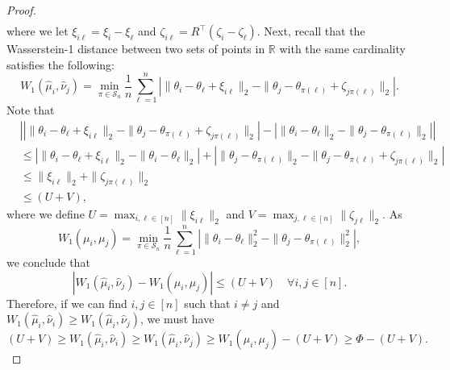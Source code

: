\documentclass[11pt,letterpaper]{article}
\theoremstyle{definition}
\numberwithin{equation}{section}
\newcommand{\cS}{\mathcal{S}}
\newcommand{\R}{\mathbb{R}}
\begin{document}
\begin{proof}
\begin{align*}
    \end{align*}
    where we let $\xi_{i \ell} = \xi_i - \xi_\ell$ and $\zeta_{i \ell} = R^\top (\zeta_i - \zeta_\ell)$. Next, recall that the Wasserstein-1 distance between two sets of points in $\R$ with the same cardinality satisfies the following:
    \begin{equation*}
        W_1(\hat{\mu}_i, \hat{\nu}_j) = \min_{\pi \in \cS_n} \frac{1}{n} \sum_{\ell = 1}^{n} \left|\|\theta_i - \theta_\ell + \xi_{i \ell}\|_2 - \|\theta_j - \theta_{\pi(\ell)} + \zeta_{j \pi(\ell)}\|_2\right|.
    \end{equation*}
    Note that   
    \begin{equation*}
        \begin{split}
            & \left|\left|\|\theta_i - \theta_\ell + \xi_{i \ell}\|_2 - \|\theta_j - \theta_{\pi(\ell)} + \zeta_{j \pi(\ell)}\|_2\right| - \left|\|\theta_i - \theta_\ell\|_2 - \|\theta_j - \theta_{\pi(\ell)}\|_2\right|\right| \\
            & \le \left|\|\theta_i - \theta_\ell + \xi_{i \ell}\|_2 - \|\theta_i - \theta_\ell\|_2\right| + \left|\|\theta_j - \theta_{\pi(\ell)}\|_2 - \|\theta_j - \theta_{\pi(\ell)} + \zeta_{j \pi(\ell)}\|_2\right| \\
            & \le \|\xi_{i \ell}\|_2 + \|\zeta_{j \pi(\ell)}\|_2 \\
            & \le (U + V),
        \end{split}
    \end{equation*}
    where we define $U = \max_{i, \ell \in [n]} \|\xi_{i \ell}\|_2$ and $V = \max_{j, \ell \in [n]} \|\zeta_{j \ell}\|_2$. As 
    \begin{equation*}
        W_1(\mu_i, \mu_j) = \min_{\pi \in \cS_n} \frac{1}{n} \sum_{\ell = 1}^{n} \left|\|\theta_i - \theta_\ell\|_2^2 - \|\theta_j - \theta_{\pi(\ell)}\|_2^2\right|,
    \end{equation*}
    we conclude that 
    \begin{equation*}
        |W_1(\hat{\mu}_i, \hat{\nu}_j) - W_1(\mu_i, \mu_j)| \le (U + V) \quad \forall i, j \in [n].
    \end{equation*}
    Therefore, if we can find $i, j \in [n]$ such that $i \neq j$ and $W_1(\hat{\mu}_i, \hat{\nu}_i) \ge W_1(\hat{\mu}_i, \hat{\nu}_j)$, we must have 
    \begin{equation*}
        (U + V) \ge W_1(\hat{\mu}_i, \hat{\nu}_i) \ge W_1(\hat{\mu}_i, \hat{\nu}_j) \ge W_1(\mu_i, \mu_j) - (U + V) \ge \Phi - (U + V).
    \end{equation*}

\end{proof}
\end{document}
